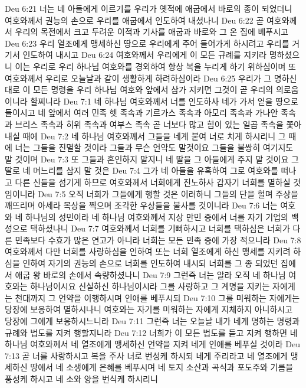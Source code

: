Deu 6:21  너는 네 아들에게 이르기를 우리가 옛적에 애굽에서 바로의 종이 되었더니 여호와께서 권능의 손으로 우리를 애굽에서 인도하여 내셨나니
Deu 6:22  곧 여호와께서 우리의 목전에서 크고 두려운 이적과 기사를 애굽과 바로와 그 온 집에 베푸시고
Deu 6:23  우리 열조에게 맹세하신 땅으로 우리에게 주어 들어가게 하시려고 우리를 거기서 인도하여 내시고
Deu 6:24  여호와께서 우리에게 이 모든 규례를 지키라 명하셨으니 이는 우리로 우리 하나님 여호와를 경외하여 항상 복을 누리게 하기 위하심이며 또 여호와께서 우리로 오늘날과 같이 생활하게 하려하심이라
Deu 6:25  우리가 그 명하신대로 이 모든 명령을 우리 하나님 여호와 앞에서 삼가 지키면 그것이 곧 우리의 의로움이니라 할찌니라
Deu 7:1  네 하나님 여호와께서 너를 인도하사 네가 가서 얻을 땅으로 들이시고 네 앞에서 여러 민족 헷 족속과 기르가스 족속과 아모리 족속과 가나안 족속과 브리스 족속과 히위 족속과 여부스 족속 곧 너보다 많고 힘이 있는 일곱 족속을 쫓아내실 때에
Deu 7:2  네 하나님 여호와께서 그들을 네게 붙여 너로 치게 하시리니 그 때에 너는 그들을 진멸할 것이라 그들과 무슨 언약도 말것이요 그들을 불쌍히 여기지도 말 것이며
Deu 7:3  또 그들과 혼인하지 말지니 네 딸을 그 아들에게 주지 말 것이요 그 딸로 네 며느리를 삼지 말 것은
Deu 7:4  그가 네 아들을 유혹하여 그로 여호와를 떠나고 다른 신들을 섬기게 하므로 여호와께서 너희에게 진노하사 갑자기 너희를 멸하실 것임이니라
Deu 7:5  오직 너희가 그들에게 행할 것은 이러하니 그들의 단을 헐며 주상을 깨뜨리며 아세라 목상을 찍으며 조각한 우상들을 불사를 것이니라
Deu 7:6  너는 여호와 네 하나님의 성민이라 네 하나님 여호와께서 지상 만민 중에서 너를 자기 기업의 백성으로 택하셨나니
Deu 7:7  여호와께서 너희를 기뻐하시고 너희를 택하심은 너희가 다른 민족보다 수효가 많은 연고가 아니라 너희는 모든 민족 중에 가장 적으니라
Deu 7:8  여호와께서 다만 너희를 사랑하심을 인하여 또는 너희 열조에게 하신 맹세를 지키려 하심을 인하여 자기의 권능의 손으로 너희를 인도하여 내시되 너희를 그 종 되었던 집에서 애굽 왕 바로의 손에서 속량하셨나니
Deu 7:9  그런즉 너는 알라 오직 네 하나님 여호와는 하나님이시요 신실하신 하나님이시라 그를 사랑하고 그 계명을 지키는 자에게는 천대까지 그 언약을 이행하시며 인애를 베푸시되
Deu 7:10  그를 미워하는 자에게는 당장에 보응하여 멸하시나니 여호와는 자기를 미워하는 자에게 지체하지 아니하시고 당장에 그에게 보응하시느니라
Deu 7:11  그런즉 너는 오늘날 내가 네게 명하는 명령과 규례와 법도를 지켜 행할지니라
Deu 7:12  너희가 이 모든 법도를 듣고 지켜 행하면 네 하나님 여호와께서 네 열조에게 맹세하신 언약을 지켜 네게 인애를 베푸실 것이라
Deu 7:13  곧 너를 사랑하시고 복을 주사 너로 번성케 하시되 네게 주리라고 네 열조에게 맹세하신 땅에서 네 소생에게 은혜를 베푸시며 네 토지 소산과 곡식과 포도주와 기름을 풍성케 하시고 네 소와 양을 번식케 하시리니
